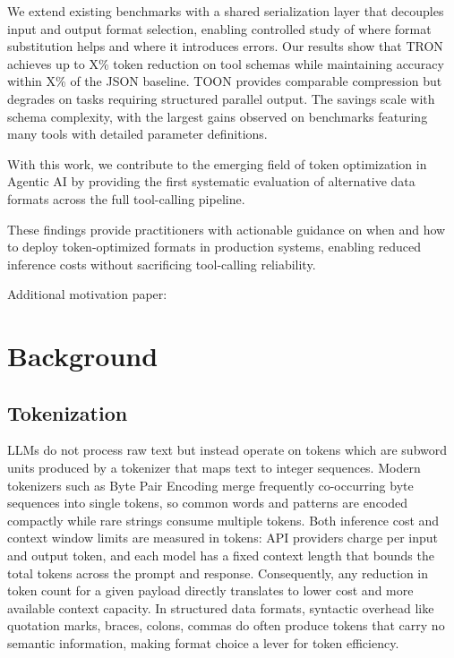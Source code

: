 \documentclass[11pt]{article}
\begin{document}
We extend existing benchmarks with a shared serialization layer that decouples input and output format selection, enabling controlled study of where format substitution helps and where it introduces errors. Our results show that TRON achieves up to X\% token reduction on tool schemas while maintaining accuracy within X\% of the JSON baseline. TOON provides comparable compression but degrades on tasks requiring structured parallel output. The savings scale with schema complexity, with the largest gains observed on benchmarks featuring many tools with detailed parameter definitions.

With this work, we contribute to the emerging field of token optimization in Agentic AI by providing the first systematic evaluation of alternative data formats across the full tool-calling pipeline. 

These findings provide practitioners with actionable guidance on when and how to deploy token-optimized formats in production systems, enabling reduced inference costs without sacrificing tool-calling reliability.

Additional motivation paper: \citep{Levy_Jacoby_Goldberg_2024}

\section{Background}
\subsection{Tokenization}

LLMs do not process raw text but instead operate on tokens which are subword units produced by a tokenizer that maps text to integer sequences. Modern tokenizers such as Byte Pair Encoding \citep{sennrich2016neural} merge frequently co-occurring byte sequences into single tokens, so common words and patterns are encoded compactly while rare strings consume multiple tokens. Both inference cost and context window limits are measured in tokens: API providers charge per input and output token, and each model has a fixed context length that bounds the total tokens across the prompt and response. Consequently, any reduction in token count for a given payload directly translates to lower cost and more available context capacity. In structured data formats, syntactic overhead like quotation marks, braces, colons, commas do often produce tokens that carry no semantic information, making format choice a lever for token efficiency.
\end{document}
